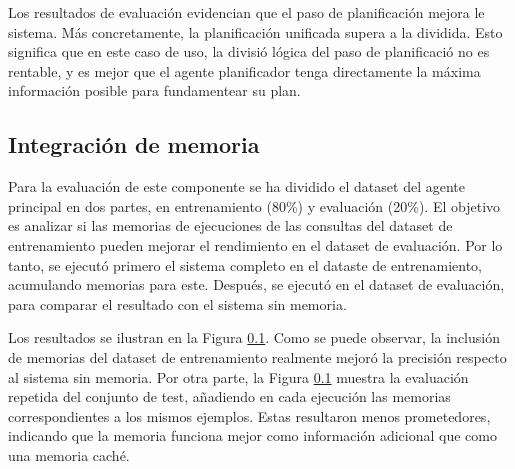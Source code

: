 Los resultados de evaluación evidencian que el paso de planificación mejora le sistema. Más concretamente, la planificación unificada supera a la dividida. Esto significa que en este caso de uso, la divisió lógica del paso de planificació no es rentable, y es mejor que el agente planificador tenga directamente la máxima información posible para fundamentear su plan. 

\subsection{Integración de memoria}
Para la evaluación de este componente se ha dividido el dataset del agente principal en dos partes, en entrenamiento (80\%) y evaluación (20\%). El objetivo es analizar si las memorias de ejecuciones de las consultas del dataset de entrenamiento pueden mejorar el rendimiento en el dataset de evaluación. Por lo tanto, se ejecutó primero el sistema completo en el dataste de entrenamiento, acumulando memorias para este. Después, se ejecutó en el dataset de evaluación, para comparar el resultado con el sistema sin memoria.

Los resultados se ilustran en la Figura \ref{}. Como se puede observar, la inclusión de memorias del dataset de entrenamiento realmente mejoró la precisión respecto al sistema sin memoria. Por otra parte, la Figura \ref{} muestra la evaluación repetida del conjunto de test, añadiendo en cada ejecución las memorias correspondientes a los mismos ejemplos. Estas resultaron menos prometedores, indicando que la memoria funciona mejor como información adicional que como una memoria caché. 

